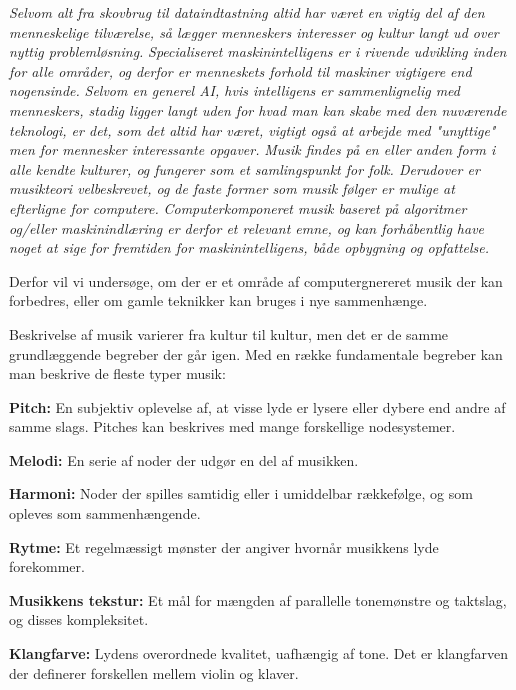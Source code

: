 \documentclass[12pt]{Article}
\begin{document}
\maketitle
\textit{
Selvom alt fra skovbrug til dataindtastning altid har været en vigtig del af den menneskelige tilværelse, så lægger menneskers interesser og kultur langt ud over nyttig problemløsning. }
\textit{
Specialiseret maskinintelligens er i rivende udvikling inden for alle områder, og derfor er menneskets forhold til maskiner vigtigere end nogensinde.}
\textit{
Selvom en generel AI, hvis intelligens er sammenlignelig med menneskers, stadig ligger langt uden for hvad man kan skabe med den nuværende teknologi, er det, som det altid har været, vigtigt også at arbejde med "unyttige" men for mennesker interessante opgaver.}
\textit{
Musik findes på en eller anden form i alle kendte kulturer, og fungerer som et samlingspunkt for folk. Derudover er musikteori velbeskrevet, og de faste former som musik følger er mulige at efterligne for computere.}
\textit{
Computerkomponeret musik baseret på algoritmer og/eller maskinindlæring er derfor et relevant emne, og kan  forhåbentlig have noget at sige for fremtiden for maskinintelligens, både opbygning og opfattelse.}





Derfor vil vi undersøge, om der er et område af computergnereret musik der kan forbedres, eller om gamle teknikker kan bruges i nye sammenhænge.

Beskrivelse af musik varierer fra kultur til kultur, men det er de samme grundlæggende begreber der går igen. Med en række fundamentale begreber kan man beskrive de fleste typer musik:

\textbf{Pitch:} En subjektiv oplevelse af, at visse lyde er lysere eller dybere end andre af samme slags. Pitches kan beskrives med mange forskellige nodesystemer.

\textbf{Melodi:} En serie af noder der udgør en del af musikken.

\textbf{Harmoni:} Noder der spilles samtidig eller i umiddelbar rækkefølge, og som opleves som sammenhængende.

\textbf{Rytme:} Et regelmæssigt mønster der angiver hvornår musikkens lyde forekommer.

\textbf{Musikkens tekstur:} Et mål for mængden af parallelle tonemønstre og taktslag, og disses kompleksitet.

\textbf{Klangfarve:} Lydens overordnede kvalitet, uafhængig af tone. Det er klangfarven der definerer forskellen mellem violin og klaver.
\end{document}
